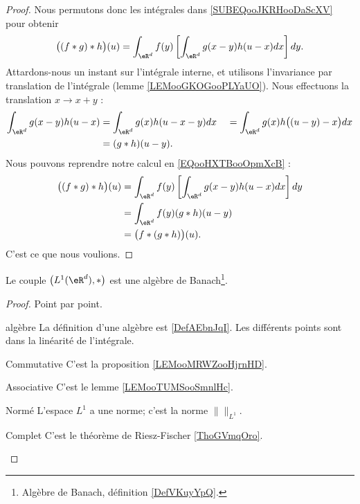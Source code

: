 \begin{proof}
    Nous permutons donc les intégrales dans \eqref{SUBEQooJKRHooDaScXV} pour obtenir
    \begin{equation}        \label{EQooHXTBooOpmXcB}
        \big( (f*g)*h \big)(u)=\int_{\eR^d}f(y)\left[ \int_{\eR^d}g(x-y)h(u-x)dx \right]dy.
    \end{equation}
    Attardons-nous un instant sur l'intégrale interne, et utilisons l'invariance par translation de l'intégrale (lemme \ref{LEMooGKOGooPLYaUO}). Nous effectuons la translation \( x\to x+y\) :
    \begin{subequations}
        \begin{align}
            \int_{\eR^d}g(x-y)h(u-x)&=\int_{\eR^d}g(x)h(u-x-y)dx\
            &=\int_{\eR^d}g(x)h\big( (u-y)-x \big)dx\\
            &=(g*h)(u-y).
        \end{align}
    \end{subequations}
    Nous pouvons reprendre notre calcul en \eqref{EQooHXTBooOpmXcB} :
    \begin{subequations}
        \begin{align}
        \big( (f*g)*h \big)(u)&=\int_{\eR^d}f(y)\left[ \int_{\eR^d}g(x-y)h(u-x)dx \right]dy\\
        &=\int_{\eR^d}f(y)(g*h)(u-y)\\
        &=\big( f*(g*h) \big)(u).
        \end{align}
    \end{subequations}
    C'est ce que nous voulions.
\end{proof}

\begin{proposition}     \label{PROPooNBHNooInwoar}
    Le couple \( \big( L^1(\eR^d), * \big)\) est une algèbre de Banach\footnote{Algèbre de Banach, définition \ref{DefVKuyYpQ}.}.
\end{proposition}

\begin{proof}
    Point par point.
    \begin{subproof}
        \item[algèbre]
            La définition d'une algèbre est \ref{DefAEbnJqI}. Les différents points sont dans la linéarité de l'intégrale.
        \item[Commutative]
            C'est la proposition \ref{LEMooMRWZooHjrnHD}.
        \item[Associative]
            C'est le lemme \ref{LEMooTUMSooSmnlHc}.
        \item[Normé]
            L'espace \( L^1\) a une norme; c'est la norme \( \|  \|_{L^1}\).
        \item[Complet]
            C'est le théorème de Riesz-Fischer \ref{ThoGVmqOro}.
    \end{subproof}
\end{proof}


